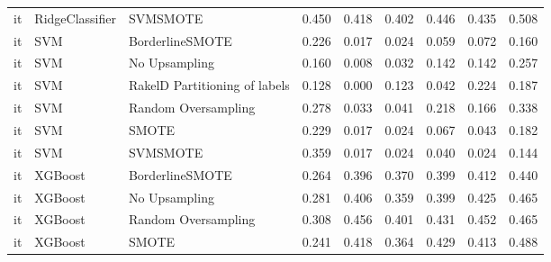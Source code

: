 \begin{tabular}{lllllllll}
      it &                 RidgeClassifier &                      SVMSMOTE & 0.450 &                     0.418 &                 0.402 &                  0.446 &                                   0.435 &     0.508 \\
      it &                             SVM &               BorderlineSMOTE & 0.226 &                     0.017 &                 0.024 &                  0.059 &                                   0.072 &     0.160 \\
      it &                             SVM &                 No Upsampling & 0.160 &                     0.008 &                 0.032 &                  0.142 &                                   0.142 &     0.257 \\
      it &                             SVM & RakelD Partitioning of labels & 0.128 &                     0.000 &                 0.123 &                  0.042 &                                   0.224 &     0.187 \\
      it &                             SVM &           Random Oversampling & 0.278 &                     0.033 &                 0.041 &                  0.218 &                                   0.166 &     0.338 \\
      it &                             SVM &                         SMOTE & 0.229 &                     0.017 &                 0.024 &                  0.067 &                                   0.043 &     0.182 \\
      it &                             SVM &                      SVMSMOTE & 0.359 &                     0.017 &                 0.024 &                  0.040 &                                   0.024 &     0.144 \\
      it &                         XGBoost &               BorderlineSMOTE & 0.264 &                     0.396 &                 0.370 &                  0.399 &                                   0.412 &     0.440 \\
      it &                         XGBoost &                 No Upsampling & 0.281 &                     0.406 &                 0.359 &                  0.399 &                                   0.425 &     0.465 \\
      it &                         XGBoost &           Random Oversampling & 0.308 &                     0.456 &                 0.401 &                  0.431 &                                   0.452 &     0.465 \\
      it &                         XGBoost &                         SMOTE & 0.241 &                     0.418 &                 0.364 &                  0.429 &                                   0.413 &     0.488 \\

\end{tabular}
